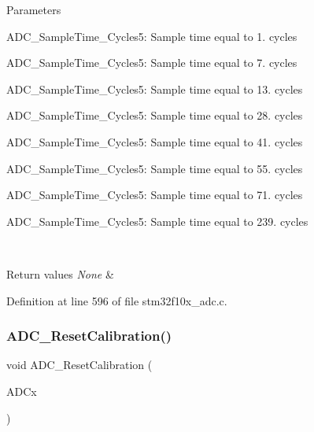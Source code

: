 \begin{DoxyParams}{Parameters}
\begin{DoxyItemize}
\item A\+D\+C\+\_\+\+Sample\+Time\+\_\+Cycles5\+: Sample time equal to 1. cycles \item A\+D\+C\+\_\+\+Sample\+Time\+\_\+Cycles5\+: Sample time equal to 7. cycles \item A\+D\+C\+\_\+\+Sample\+Time\+\_\+Cycles5\+: Sample time equal to 13. cycles \item A\+D\+C\+\_\+\+Sample\+Time\+\_\+Cycles5\+: Sample time equal to 28. cycles \item A\+D\+C\+\_\+\+Sample\+Time\+\_\+Cycles5\+: Sample time equal to 41. cycles \item A\+D\+C\+\_\+\+Sample\+Time\+\_\+Cycles5\+: Sample time equal to 55. cycles \item A\+D\+C\+\_\+\+Sample\+Time\+\_\+Cycles5\+: Sample time equal to 71. cycles \item A\+D\+C\+\_\+\+Sample\+Time\+\_\+Cycles5\+: Sample time equal to 239. cycles \end{DoxyItemize}
\\
\hline
\end{DoxyParams}

\begin{DoxyRetVals}{Return values}
{\em None} & \\
\hline
\end{DoxyRetVals}


Definition at line 596 of file stm32f10x\+\_\+adc.\+c.

\mbox{\label{group___a_d_c___private___functions_ga3d542020ba28c1d16238a0defbee6d8f}} 
\subsubsection{\texorpdfstring{A\+D\+C\+\_\+\+Reset\+Calibration()}{ADC\_ResetCalibration()}}
{\footnotesize\ttfamily void A\+D\+C\+\_\+\+Reset\+Calibration (\begin{DoxyParamCaption}\item[{\hyperlink{struct_a_d_c___type_def}{A\+D\+C\+\_\+\+Type\+Def} $\ast$}]{A\+D\+Cx }\end{DoxyParamCaption})}



